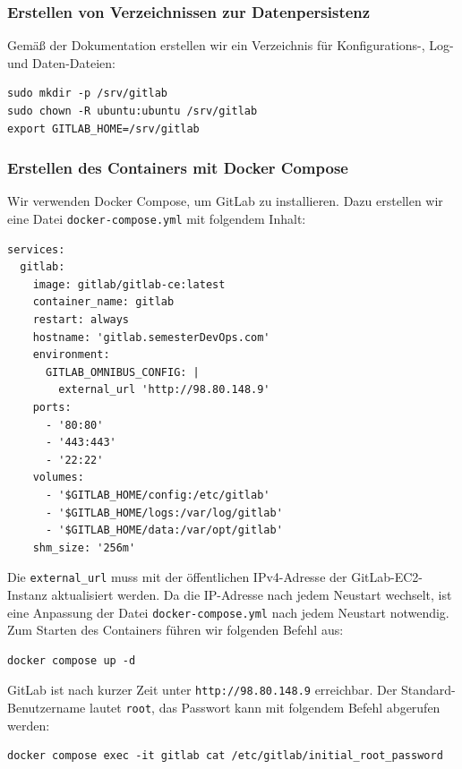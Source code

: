 \documentclass[a4paper,12pt]{article}
\begin{document}
\subsubsection{Erstellen von Verzeichnissen zur Datenpersistenz}
Gemäß der Dokumentation erstellen wir ein Verzeichnis für Konfigurations-, Log- und Daten-Dateien:

\begin{verbatim}
sudo mkdir -p /srv/gitlab
sudo chown -R ubuntu:ubuntu /srv/gitlab
export GITLAB_HOME=/srv/gitlab
\end{verbatim}

\newpage

\subsubsection{Erstellen des Containers mit Docker Compose}
Wir verwenden Docker Compose, um GitLab zu installieren. Dazu erstellen wir eine Datei \texttt{docker-compose.yml} mit folgendem Inhalt:

\begin{verbatim}
services:
  gitlab:
    image: gitlab/gitlab-ce:latest
    container_name: gitlab
    restart: always
    hostname: 'gitlab.semesterDevOps.com'
    environment:
      GITLAB_OMNIBUS_CONFIG: |
        external_url 'http://98.80.148.9'
    ports:
      - '80:80'
      - '443:443'
      - '22:22'
    volumes:
      - '$GITLAB_HOME/config:/etc/gitlab'
      - '$GITLAB_HOME/logs:/var/log/gitlab'
      - '$GITLAB_HOME/data:/var/opt/gitlab'
    shm_size: '256m'
\end{verbatim}

Die \texttt{external\_url} muss mit der öffentlichen IPv4-Adresse der GitLab-EC2-Instanz aktualisiert werden. Da die IP-Adresse nach jedem Neustart wechselt, ist eine Anpassung der Datei \texttt{docker-compose.yml} nach jedem Neustart notwendig.
Zum Starten des Containers führen wir folgenden Befehl aus:

\begin{verbatim}
docker compose up -d
\end{verbatim}

GitLab ist nach kurzer Zeit unter \texttt{http://98.80.148.9} erreichbar. Der Standard-Benutzername lautet \texttt{root}, das Passwort kann mit folgendem Befehl abgerufen werden:

\begin{verbatim}
docker compose exec -it gitlab cat /etc/gitlab/initial_root_password
\end{verbatim}
\end{document}
